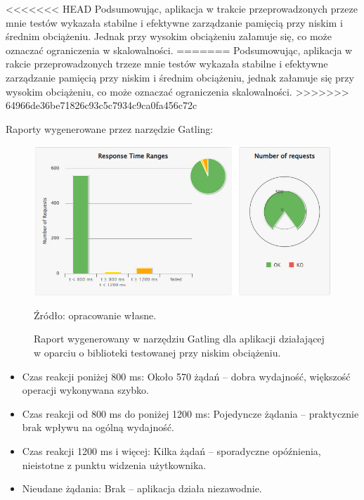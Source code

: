 \documentclass[runningheads,12pt]{llncs}
\begin{document}
<<<<<<< HEAD
Podsumowując, aplikacja w trakcie przeprowadzonych przeze mnie testów wykazała stabilne i efektywne zarządzanie pamięcią przy niskim i średnim obciążeniu. Jednak przy wysokim obciążeniu załamuje się, co może oznaczać ograniczenia w skalowalności.
=======
Podsumowując, aplikacja w rakcie przeprowadzonych trzeze mnie testów wykazała stabilne i efektywne zarządzanie pamięcią przy niskim i średnim obciążeniu, jednak załamuje się przy wysokim obciążeniu, co może oznaczać ograniczenia skalowalności.
>>>>>>> 64966de36be71826c93c5c7934c9ca0fa456c72c

\newpage

Raporty wygenerowane przez narzędzie Gatling:


\begin{figure}
    \centering
    \includegraphics[width=0.8\linewidth]{images/library-gatling-low-graph.jpg}
    \caption{Raport wygenerowany w narzędziu Gatling dla aplikacji działającej w oparciu o biblioteki testowanej przy niskim obciążeniu.}
    \vspace{0.5em}
    {\small Źródło: opracowanie własne.}
    \label{fig:low}
\end{figure}

\begin{itemize}
    \item Czas reakcji poniżej 800 ms: Około 570 żądań – dobra wydajność, większość operacji wykonywana szybko.
    \item Czas reakcji od 800 ms do poniżej 1200 ms: Pojedyncze żądania – praktycznie brak wpływu na ogólną wydajność.
    \item Czas reakcji 1200 ms i więcej: Kilka żądań – sporadyczne opóźnienia, nieistotne z punktu widzenia użytkownika.
    \item Nieudane żądania: Brak – aplikacja działa niezawodnie.
\end{itemize}

\newpage
\end{document}
